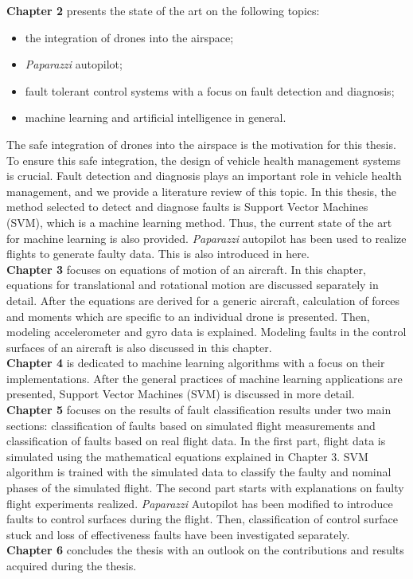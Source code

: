 \textbf{Chapter 2} presents the state of the art on the following topics: 
\begin{itemize}
\item{the integration of drones into the airspace;}
\item{\emph{Paparazzi} autopilot;}
\item{fault tolerant control systems with a focus on fault detection and diagnosis;}
\item{machine learning and artificial intelligence in general.}
\end{itemize}
The safe integration of drones into the airspace is the motivation for this thesis. To ensure this safe integration, the design of vehicle health management systems is crucial. Fault detection and diagnosis plays an important role in vehicle health management, and we provide a literature review of this topic. In this thesis, the method selected to detect and diagnose faults is Support Vector Machines (SVM), which is a machine learning method. Thus, the current state of the art for machine learning is also provided. \emph{Paparazzi} autopilot has been used to realize flights to generate faulty data. This is also introduced  in here.\\
\textbf{Chapter 3} focuses on equations of motion of an aircraft. In this chapter, equations for translational and rotational motion are discussed separately in detail. After the equations are derived for a generic aircraft, calculation of forces and moments which are specific to an individual drone is presented. Then, modeling accelerometer and gyro data is explained. Modeling faults in the control surfaces of an aircraft is also discussed in this chapter.\\
\textbf{Chapter 4} is dedicated to machine learning algorithms with a focus on their implementations. After the general practices of machine learning applications are presented, Support Vector Machines (SVM) is discussed in more detail.\\
\textbf{Chapter 5} focuses on the results of fault classification results under two main sections: classification of faults based on simulated  flight measurements and classification of faults based on real flight data. In the first part, flight data is simulated using the mathematical equations explained in Chapter 3. SVM algorithm is trained with the simulated data to classify the faulty and nominal phases of the simulated flight. The second part starts with explanations on faulty flight experiments realized. \emph{Paparazzi} Autopilot has been modified to introduce faults to control surfaces during the flight. Then, classification of control surface stuck and loss of effectiveness faults have been investigated separately.\\
\textbf{Chapter 6} concludes the thesis with an outlook on the contributions and results acquired during the thesis.